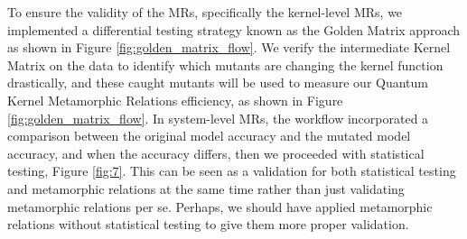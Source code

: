 \documentclass[12pt,a4paper]{article}
\begin{document}
To ensure the validity of the MRs, specifically the kernel-level MRs, we implemented a differential testing strategy \cite{mckeeman1998} known as the Golden Matrix approach as shown in Figure \ref{fig:golden_matrix_flow}. We verify the intermediate Kernel Matrix \cite{wang2021} on the data to identify which mutants are changing the kernel function drastically, and these caught mutants will be used to measure our Quantum Kernel Metamorphic Relations efficiency, as shown in Figure \ref{fig:golden_matrix_flow}. 	In system-level MRs, the workflow incorporated a comparison between the original model accuracy and the mutated model accuracy, and when the accuracy differs, then we proceeded with statistical testing, Figure \ref{fig:7}. This can be seen as a validation for both statistical testing and metamorphic relations at the same time rather than just validating metamorphic relations per se. Perhaps, we should have applied metamorphic relations without statistical testing to give them more proper validation.
	
	
	
\end{document}
